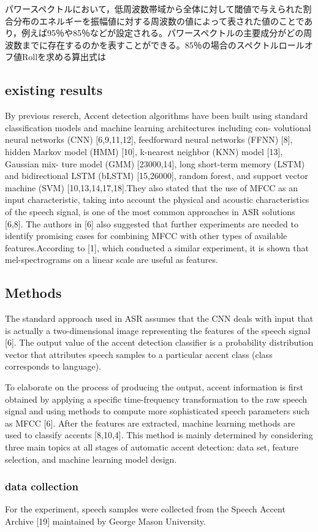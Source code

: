 パワースペクトルにおいて，低周波数帯域から全体に対して閾値で与えられた割合分布のエネルギーを振幅値に対する周波数の値によって表された値のことであり，例えば95％や85％などが設定される。パワースペクトルの主要成分がどの周波数までに存在するのかを表すことができる。85％の場合のスペクトルロールオフ値Rollを求める算出式は\documentclass[ams]{U-AizuGT}
\begin{document}
\subsection{existing results}
By previous reserch, Accent detection algorithms have been built using standard classification models and machine learning architectures including con- volutional neural networks (CNN) [6,9,11,12], feedforward neural networks (FFNN) [8], hidden Markov model (HMM) [10], k-nearest neighbor (KNN) model [13], Gaussian mix- ture model (GMM) [23000,14], long short-term memory (LSTM) and bidirectional LSTM (bLSTM) [15,26000], random forest, and support vector machine (SVM) [10,13,14,17,18].They also stated that the use of MFCC as an input characteristic, taking into account the physical and acoustic characteristics of the speech signal, is one of the most common approaches in ASR solutions [6,8]. The authors in [6] also suggested that further experiments are needed to identify promising cases for combining MFCC with other types of available features.According to [1], which conducted a similar experiment, it is shown that mel-spectrograms on a linear scale are useful as features.

\subsection{Methods}
The standard approach used in ASR assumes that the CNN deals with input that is actually a two-dimensional image representing the features of the speech signal [6]. The output value of the accent detection classifier is a probability distribution vector that attributes speech samples to a particular accent class (class corresponds to language). \par
To elaborate on the process of producing the output, accent information is first obtained by applying a specific time-frequency transformation to the raw speech signal and using methods to compute more sophisticated speech parameters such as MFCC [6]. After the features are extracted, machine learning methods are used to classify accents [8,10,4]. This method is mainly determined by considering three main topics at all stages of automatic accent detection: data set, feature selection, and machine learning model design.
\subsubsection{data collection}
For the experiment, speech samples were collected from the Speech Accent Archive [19] maintained by George Mason University.
\end{document}
